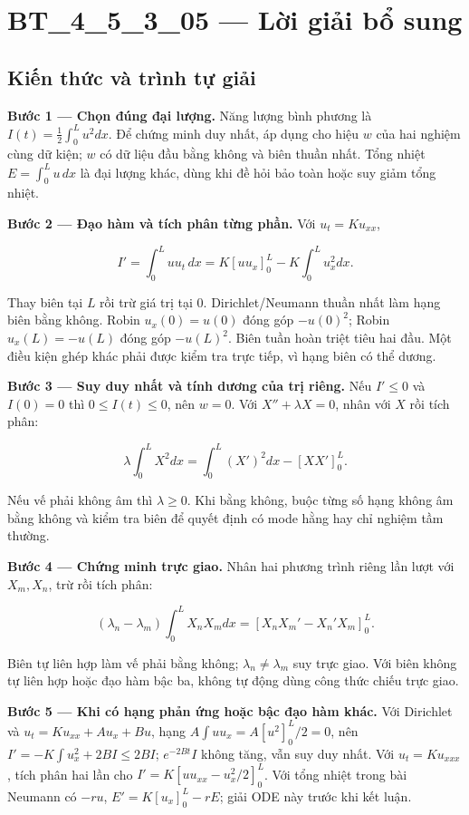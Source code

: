 \documentclass[10pt,a4paper]{article}
\begin{document}
\section*{BT\_4\_5\_3\_05 — Lời giải bổ sung}
\subsection*{Kiến thức và trình tự giải}
\textbf{Bước 1 — Chọn đúng đại lượng.} Năng lượng bình phương là $I(t)=\frac12\int_0^Lu^2dx$. Để chứng minh duy nhất, áp dụng cho hiệu $w$ của hai nghiệm cùng dữ kiện; $w$ có dữ liệu đầu bằng không và biên thuần nhất. Tổng nhiệt $E=\int_0^Lu\,dx$ là đại lượng khác, dùng khi đề hỏi bảo toàn hoặc suy giảm tổng nhiệt.

\textbf{Bước 2 — Đạo hàm và tích phân từng phần.} Với $u_t=Ku_{xx}$,


\[
I'=\int_0^Luu_t\,dx
=K[uu_x]_0^L-K\int_0^Lu_x^2dx.
\]


Thay biên tại $L$ rồi trừ giá trị tại $0$. Dirichlet/Neumann thuần nhất làm hạng biên bằng không. Robin $u_x(0)=u(0)$ đóng góp $-u(0)^2$; Robin $u_x(L)=-u(L)$ đóng góp $-u(L)^2$. Biên tuần hoàn triệt tiêu hai đầu. Một điều kiện ghép khác phải được kiểm tra trực tiếp, vì hạng biên có thể dương.

\textbf{Bước 3 — Suy duy nhất và tính dương của trị riêng.} Nếu $I'\le0$ và $I(0)=0$ thì $0\le I(t)\le0$, nên $w=0$. Với $X''+\lambda X=0$, nhân với $X$ rồi tích phân:


\[
\lambda\int_0^LX^2dx=\int_0^L(X')^2dx-[XX']_0^L.
\]


Nếu vế phải không âm thì $\lambda\ge0$. Khi bằng không, buộc từng số hạng không âm bằng không và kiểm tra biên để quyết định có mode hằng hay chỉ nghiệm tầm thường.

\textbf{Bước 4 — Chứng minh trực giao.} Nhân hai phương trình riêng lần lượt với $X_m,X_n$, trừ rồi tích phân:


\[
(\lambda_n-\lambda_m)\int_0^LX_nX_mdx
=[X_nX_m'-X_n'X_m]_0^L.
\]


Biên tự liên hợp làm vế phải bằng không; $\lambda_n\ne\lambda_m$ suy trực giao. Với biên không tự liên hợp hoặc đạo hàm bậc ba, không tự động dùng công thức chiếu trực giao.

\textbf{Bước 5 — Khi có hạng phản ứng hoặc bậc đạo hàm khác.} Với Dirichlet và $u_t=Ku_{xx}+Au_x+Bu$, hạng $A\int uu_x=A[u^2]_0^L/2=0$, nên $I'=-K\int u_x^2+2BI\le2BI$; $e^{-2Bt}I$ không tăng, vẫn suy duy nhất. Với $u_t=Ku_{xxx}$, tích phân hai lần cho $I'=K[uu_{xx}-u_x^2/2]_0^L$. Với tổng nhiệt trong bài Neumann có $-ru$, $E'=K[u_x]_0^L-rE$; giải ODE này trước khi kết luận.
\end{document}
